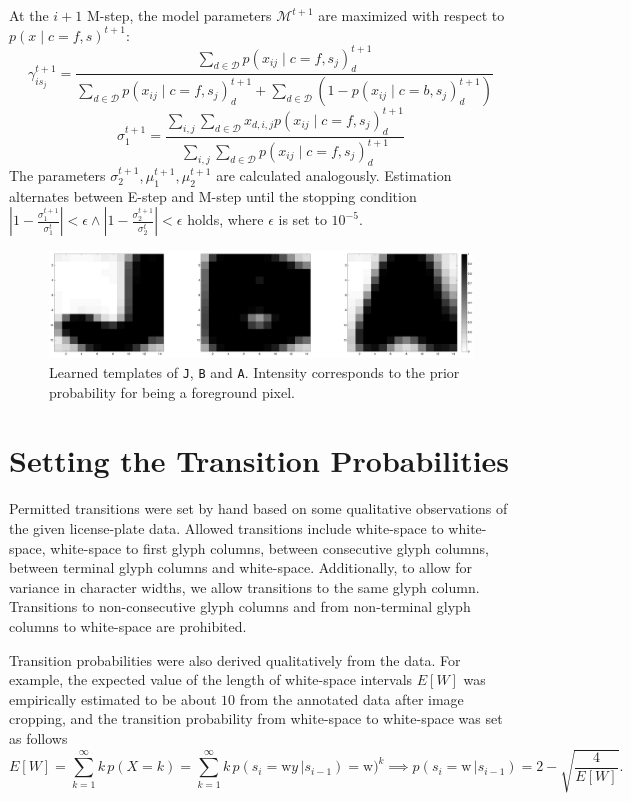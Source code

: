 \documentclass[a4paper,12pt]{article}
\newcommand{\model}{\ensuremath{\mathcal{M}}}
\begin{document}
At the $i+1$ M-step, the model parameters $\model^{t+1}$ are
maximized with respect to $p(x \mid c=f, s)^{t+1}$:
\[
  \gamma_{is_j}^{t+1} = \frac{\sum_{d \in \mathcal{D}} p(x_{ij} \mid
    c=f, s_j)_d^{t+1}}{\sum_{d \in \mathcal{D}} p(x_{ij} \mid c=f,
    s_j)_d^{t+1} + \sum_{d \in \mathcal{D}} (1-p(x_{ij} \mid c=b,
    s_j)_d^{t+1})}
\]
\[
  \sigma_1^{t+1} = \frac{\sum_{i,j} \sum_{d \in \mathcal{D}} x_{d,
      i,j} p(x_{ij} \mid c=f, s_j)_d^{t+1} }{\sum_{i,j} \sum_{d \in
      \mathcal{D}} p(x_{ij} \mid c=f, s_j)_d^{t+1}}
\]
The parameters $\sigma_2^{t+1}, \mu_1^{t+1}, \mu_2^{t+1}$ are
calculated analogously. Estimation alternates between E-step and
M-step until the stopping condition
$|1-\frac{\sigma_1^{t+1}}{\sigma_1^{t}}| < \epsilon \wedge
|1-\frac{\sigma_2^{t+1}}{\sigma_2^{t}}| < \epsilon$ holds, where
$\epsilon$ is set to $10^{-5}$.

\begin{figure}[htp]
\centering
\includegraphics[width=\linewidth]{pics/jba.png}
\caption{Learned templates of \texttt{J}, \texttt{B} and
  \texttt{A}. Intensity corresponds to the prior probability for being
  a foreground pixel.}
\label{fig:templates}
\end{figure}

\section{Setting the Transition Probabilities}
Permitted transitions were set by hand based on some qualitative
observations of the given license-plate data. Allowed transitions
include white-space to white-space, white-space to first glyph
columns, between consecutive glyph columns, between terminal glyph
columns and white-space. Additionally, to allow for variance in
character widths, we allow transitions to the same glyph
column. Transitions to non-consecutive glyph columns and from
non-terminal glyph columns to white-space are prohibited.

Transition probabilities were also derived qualitatively from the
data. For example, the expected value of the length of white-space
intervals $E[W]$ was empirically estimated to be about $10$ from the
annotated data after image cropping, and the transition probability
from white-space to white-space was set as follows 
\[ 
E[W] = \sum_{k=1}^\infty k\,p(X=k) = \sum_{k=1}^\infty k
\,p(s_i=\text{w}y \,| s_{i-1})=\text{w})^k \implies p(s_i=\text{w} \,|
s_{i-1}) = 2-\sqrt{\frac{4}{E[W]}}.
\]
\end{document}
